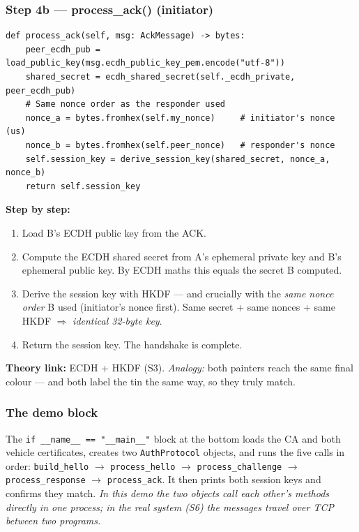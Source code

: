 \documentclass[11pt,a4paper]{article}
\begin{document}
\subsubsection*{Step 4b --- process\_ack() (initiator)}
\begin{lstlisting}[style=py,caption={auth\_protocol.py --- Step 4b: process ACK, derive the matching key.}]
def process_ack(self, msg: AckMessage) -> bytes:
    peer_ecdh_pub = load_public_key(msg.ecdh_public_key_pem.encode("utf-8"))
    shared_secret = ecdh_shared_secret(self._ecdh_private, peer_ecdh_pub)
    # Same nonce order as the responder used
    nonce_a = bytes.fromhex(self.my_nonce)     # initiator's nonce (us)
    nonce_b = bytes.fromhex(self.peer_nonce)   # responder's nonce
    self.session_key = derive_session_key(shared_secret, nonce_a, nonce_b)
    return self.session_key
\end{lstlisting}
\textbf{Step by step:}
\begin{enumerate}
  \item Load B's ECDH public key from the ACK.
  \item Compute the ECDH shared secret from A's ephemeral private key and B's
        ephemeral public key. By ECDH maths this equals the secret B computed.
  \item Derive the session key with HKDF --- and crucially with the \emph{same
        nonce order} B used (initiator's nonce first). Same secret + same nonces
        + same HKDF $\Rightarrow$ \emph{identical 32-byte key}.
  \item Return the session key. The handshake is complete.
\end{enumerate}
\textbf{Theory link:} ECDH + HKDF (S3). \emph{Analogy:} both painters reach the
same final colour --- and both label the tin the same way, so they truly match.

\subsubsection*{The demo block}
The \texttt{if \_\_name\_\_ == "\_\_main\_\_"} block at the bottom loads the CA
and both vehicle certificates, creates two \texttt{AuthProtocol} objects, and
runs the five calls in order: \texttt{build\_hello} $\to$ \texttt{process\_hello}
$\to$ \texttt{process\_challenge} $\to$ \texttt{process\_response} $\to$
\texttt{process\_ack}. It then prints both session keys and confirms they match.
\emph{In this demo the two objects call each other's methods directly in one
process; in the real system (S6) the messages travel over TCP between two
programs.}
\end{document}
